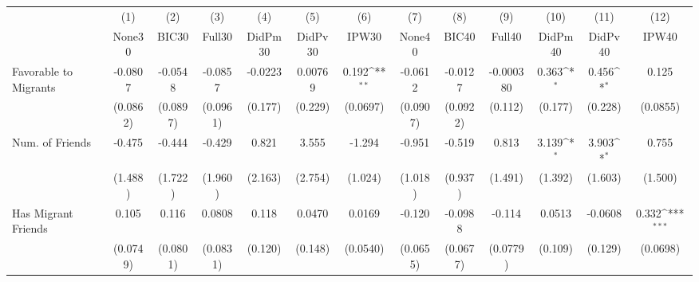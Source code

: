 {
\def\sym#1{\ifmmode^{#1}\else\(^{#1}\)\fi}
\begin{tabular}{l*{12}{c}}
\toprule
            &\multicolumn{1}{c}{(1)}&\multicolumn{1}{c}{(2)}&\multicolumn{1}{c}{(3)}&\multicolumn{1}{c}{(4)}&\multicolumn{1}{c}{(5)}&\multicolumn{1}{c}{(6)}&\multicolumn{1}{c}{(7)}&\multicolumn{1}{c}{(8)}&\multicolumn{1}{c}{(9)}&\multicolumn{1}{c}{(10)}&\multicolumn{1}{c}{(11)}&\multicolumn{1}{c}{(12)}\\
            &\multicolumn{1}{c}{None30}&\multicolumn{1}{c}{BIC30}&\multicolumn{1}{c}{Full30}&\multicolumn{1}{c}{DidPm30}&\multicolumn{1}{c}{DidPv30}&\multicolumn{1}{c}{IPW30}&\multicolumn{1}{c}{None40}&\multicolumn{1}{c}{BIC40}&\multicolumn{1}{c}{Full40}&\multicolumn{1}{c}{DidPm40}&\multicolumn{1}{c}{DidPv40}&\multicolumn{1}{c}{IPW40}\\
\midrule
Favorable to Migrants&     -0.0807         &     -0.0548         &     -0.0857         &     -0.0223         &     0.00769         &       0.192\sym{**} &     -0.0612         &     -0.0127         &   -0.000380         &       0.363\sym{*}  &       0.456\sym{*}  &       0.125         \\
            &    (0.0862)         &    (0.0897)         &    (0.0961)         &     (0.177)         &     (0.229)         &    (0.0697)         &    (0.0907)         &    (0.0922)         &     (0.112)         &     (0.177)         &     (0.228)         &    (0.0855)         \\
\addlinespace
Num. of Friends&      -0.475         &      -0.444         &      -0.429         &       0.821         &       3.555         &      -1.294         &      -0.951         &      -0.519         &       0.813         &       3.139\sym{*}  &       3.903\sym{*}  &       0.755         \\
            &     (1.488)         &     (1.722)         &     (1.960)         &     (2.163)         &     (2.754)         &     (1.024)         &     (1.018)         &     (0.937)         &     (1.491)         &     (1.392)         &     (1.603)         &     (1.500)         \\
\addlinespace
Has Migrant Friends&       0.105         &       0.116         &      0.0808         &       0.118         &      0.0470         &      0.0169         &      -0.120         &     -0.0988         &      -0.114         &      0.0513         &     -0.0608         &       0.332\sym{***}\\
            &    (0.0749)         &    (0.0801)         &    (0.0831)         &     (0.120)         &     (0.148)         &    (0.0540)         &    (0.0655)         &    (0.0677)         &    (0.0779)         &     (0.109)         &     (0.129)         &    (0.0698)         \\

\end{tabular}}
